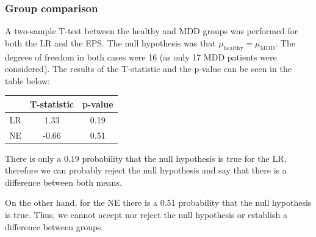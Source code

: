 \documentclass[12pt]{article}
\begin{document}
\subsubsection{Group comparison}

A two-sample T-test between the healthy and MDD groups was performed for both the LR and the EPS. The null hypothesis was that $\mu_{\mathrm{healthy}} = \mu_{\mathrm{MDD}}$. The degrees of freedom in both cases were 16 (as only 17 MDD patients were considered). The results of the T-statistic and the p-value can be seen in the table below:

\begin{center}
 \begin{tabular}{|c || c | c |} 
 \hline
  & T-statistic & p-value  \\ [0.5ex] 
 \hline\hline
 LR & 1.33 & 0.19 \\
 NE & -0.66 & 0.51 \\ [1ex] 
 \hline
\end{tabular}
\end{center}

There is only a 0.19 probability that the null hypothesis is true for the LR, therefore we can probably reject the null hypothesis and say that there is a difference between both means.

On the other hand, for the NE there is a 0.51 probability that the null hypothesis is true. Thus, we cannot accept nor reject the null hypothesis or establish a difference between groups.








\end{document}
